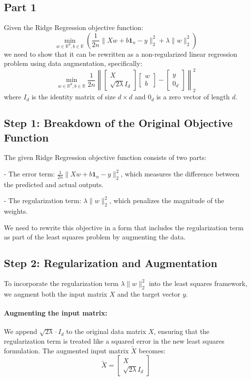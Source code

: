 \documentclass[10pt,letter,notitlepage]{article}
\begin{document}
\begin{Answer}

	\section*{Part 1}
Given the Ridge Regression objective function:
\[
\min_{w \in \mathbb{R}^d, b \in \mathbb{R}} \left( \frac{1}{2n} \| Xw + b\mathbf{1}_n - y \|_2^2 + \lambda \| w \|_2^2 \right)
\]
we need to show that it can be rewritten as a non-regularized linear regression problem using data augmentation, specifically:
\[
\min_{w \in \mathbb{R}^d, b \in \mathbb{R}} \frac{1}{2n} \left\| 
\begin{bmatrix} 
X \\
\sqrt{2\lambda}I_d
\end{bmatrix}
\begin{bmatrix}
w \\
b
\end{bmatrix} -
\begin{bmatrix}
y \\
0_d
\end{bmatrix}
\right\|_2^2
\]
where \( I_d \) is the identity matrix of size \( d \times d \) and \( 0_d \) is a zero vector of length \( d \).

\subsection*{Step 1: Breakdown of the Original Objective Function}
The given Ridge Regression objective function consists of two parts:

- The error term: \( \frac{1}{2n} \| Xw + b\mathbf{1}_n - y \|_2^2 \), which measures the difference between the predicted and actual outputs.

- The regularization term: \( \lambda \| w \|_2^2 \), which penalizes the magnitude of the weights.

We need to rewrite this objective in a form that includes the regularization term as part of the least squares problem by augmenting the data.

\subsection*{Step 2: Regularization and Augmentation}
To incorporate the regularization term \( \lambda \| w \|_2^2 \) into the least squares framework, we augment both the input matrix \( X \) and the target vector \( y \).

\paragraph{Augmenting the input matrix:}
We append \( \sqrt{2\lambda} \cdot I_d \) to the original data matrix \( X \), ensuring that the regularization term is treated like a squared error in the new least squares formulation. The augmented input matrix \( \tilde{X} \) becomes:
\[
\tilde{X} = \begin{bmatrix} 
X \\ 
\sqrt{2\lambda}I_d
\end{bmatrix}
\]


\end{Answer}
\end{document}
